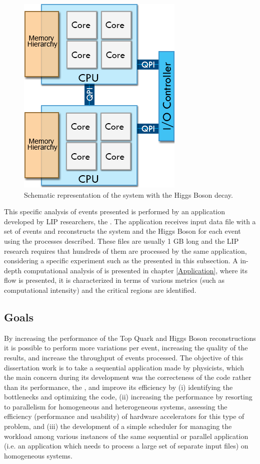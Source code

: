\begin{figure}[!htp]
	\begin{center}
		\includegraphics[scale=0.5]{../../common/img/numa_qpi.png}
		\caption{Schematic representation of the \ttbar system with the Higgs Boson decay.}
		\label{fig:HiggsBosonDecay}
	\end{center}
\end{figure}

This specific analysis of events presented is performed by an application developed by LIP researchers, the \tth. The application receives input data file with a set of events and reconstructs the \ttbar system and the Higgs Boson for each event using the processes described. These files are usually 1 GB long and the LIP research requires that hundreds of them are processed by the same application, considering a specific experiment such as the presented in this subsection. A in-depth computational analysis of \tth is presented in chapter \ref{Application}, where its flow is presented, it is characterized in terms of various metrics (such as computational intensity) and the critical regions are identified.

\subsection{Goals}
\label{Goals}

By increasing the performance of the Top Quark and Higgs Boson reconstructions it is possible to perform more variations per event, increasing the quality of the results, and increase the throughput of events processed. The objective of this dissertation work is to take a sequential application made by physicists, which the main concern during its development was the correcteness of the code rather than its performance, the \tth, and improve its efficiency by (i) identifying the bottlenecks and optimizing the code, (ii) increasing the performance by resorting to parallelism for homogeneous and heterogeneous systems, assessing the efficiency (performance and usability) of hardware accelerators for this type of problem, and (iii) the development of a simple scheduler for managing the workload among various instances of the same sequential or parallel application (i.e. an application which needs to process a large set of separate input files) on homogeneous systems.

